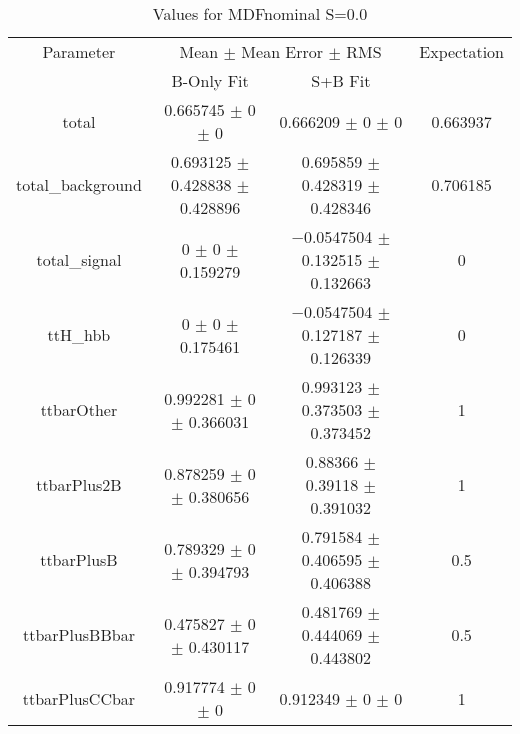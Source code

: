 \begin{table}
\centering
\caption{Values for MDFnominal S=0.0}
\begin{tabular}{cccc}
\toprule
Parameter & \multicolumn{2}{c}{Mean $\pm$ Mean Error $\pm$ RMS} & Expectation\\
 & B-Only Fit & S+B Fit & \\
\midrule
total & \num{0.665745} $\pm$ \num{0} $\pm$ \num{0} & \num{0.666209} $\pm$ \num{0} $\pm$ \num{0} & \num{0.663937}\\
total\_background & \num{0.693125} $\pm$ \num{0.428838} $\pm$ \num{0.428896} & \num{0.695859} $\pm$ \num{0.428319} $\pm$ \num{0.428346} & \num{0.706185}\\
total\_signal & \num{0} $\pm$ \num{0} $\pm$ \num{0.159279} & \num{-0.0547504} $\pm$ \num{0.132515} $\pm$ \num{0.132663} & \num{0}\\
ttH\_hbb & \num{0} $\pm$ \num{0} $\pm$ \num{0.175461} & \num{-0.0547504} $\pm$ \num{0.127187} $\pm$ \num{0.126339} & \num{0}\\
ttbarOther & \num{0.992281} $\pm$ \num{0} $\pm$ \num{0.366031} & \num{0.993123} $\pm$ \num{0.373503} $\pm$ \num{0.373452} & \num{1}\\
ttbarPlus2B & \num{0.878259} $\pm$ \num{0} $\pm$ \num{0.380656} & \num{0.88366} $\pm$ \num{0.39118} $\pm$ \num{0.391032} & \num{1}\\
ttbarPlusB & \num{0.789329} $\pm$ \num{0} $\pm$ \num{0.394793} & \num{0.791584} $\pm$ \num{0.406595} $\pm$ \num{0.406388} & \num{0.5}\\
ttbarPlusBBbar & \num{0.475827} $\pm$ \num{0} $\pm$ \num{0.430117} & \num{0.481769} $\pm$ \num{0.444069} $\pm$ \num{0.443802} & \num{0.5}\\
ttbarPlusCCbar & \num{0.917774} $\pm$ \num{0} $\pm$ \num{0} & \num{0.912349} $\pm$ \num{0} $\pm$ \num{0} & \num{1}\\
\bottomrule
\end{tabular}
\end{table}